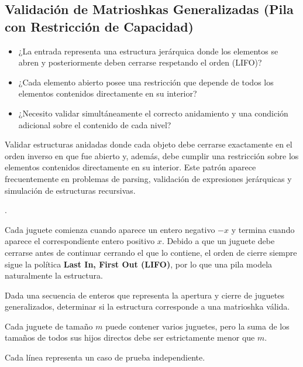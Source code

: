\subsection{Validación de Matrioshkas Generalizadas (Pila con Restricción de Capacidad)}


\begin{itemize}
\item ¿La entrada representa una estructura jerárquica donde los elementos se abren y posteriormente deben cerrarse respetando el orden (LIFO)?
\item ¿Cada elemento abierto posee una restricción que depende de todos los elementos contenidos directamente en su interior?
\item ¿Necesito validar simultáneamente el correcto anidamiento y una condición adicional sobre el contenido de cada nivel?
\end{itemize}


Validar estructuras anidadas donde cada objeto debe cerrarse exactamente en el orden inverso en que fue abierto y, además, debe cumplir una restricción sobre los elementos contenidos directamente en su interior. Este patrón aparece frecuentemente en problemas de parsing, validación de expresiones jerárquicas y simulación de estructuras recursivas.

 .


Cada juguete comienza cuando aparece un entero negativo $-x$ y termina cuando aparece el correspondiente entero positivo $x$. Debido a que un juguete debe cerrarse antes de continuar cerrando el que lo contiene, el orden de cierre siempre sigue la política \textbf{Last In, First Out (LIFO)}, por lo que una pila modela naturalmente la estructura.


Dada una secuencia de enteros que representa la apertura y cierre de juguetes generalizados, determinar si la estructura corresponde a una matrioshka válida.

Cada juguete de tamaño $m$ puede contener varios juguetes, pero la suma de los tamaños de todos sus hijos directos debe ser estrictamente menor que $m$.


Cada línea representa un caso de prueba independiente.


